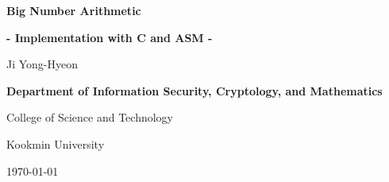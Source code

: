 \documentclass[12pt,openany]{book}
\begin{document}
	
	\begin{titlepage}
		\begin{center}
			{\Huge\textsf{\textbf{Big Number Arithmetic}}\par}
			{\Large\textsf{\textbf{- Implementation with C and ASM -}}\par}
			\vspace{0.5in}
			{\Large {Ji Yong-Hyeon}\par}
			\vspace{1in}
			\vspace{1in}
			{\large\bf \textsf{Department of Information Security, Cryptology, and Mathematics}\par}
			{\textsf{College of Science and Technology}\par}
			{\textsf{Kookmin University}\par}
			\vspace{.25in}
			{\large \textsf{\today}\par}
		\end{center}
	\end{titlepage}
	
	\frontmatter
%	
%	
	
	\newpage
	\tableofcontents
	\newpage
	\mainmatter
	
	
	
	\newpage
	
	
	
	\appendix
%	
%	
	
	
	\backmatter
	
\end{document}
